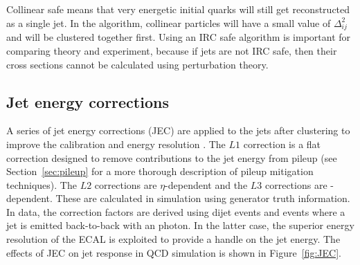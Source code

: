Collinear safe means that very energetic initial quarks will still get reconstructed as a single jet. In the \antikt algorithm, collinear particles will have a small value of $\Delta^2_{ij}$ and will be clustered together first. Using an IRC safe algorithm is important for comparing theory and experiment, because if jets are not IRC safe, then their cross sections cannot be calculated using perturbation theory.

\subsection{Jet energy corrections}
\label{sec:JEC}

A series of jet energy corrections (JEC) are applied to the jets after clustering to improve the calibration and energy resolution \cite{JEC}. The $L1$ correction is a flat correction designed to remove contributions to the jet energy from pileup (see Section~\ref{sec:pileup} for a more thorough description of pileup mitigation techniques). The $L2$ corrections are $\eta$-dependent and the $L3$ corrections are \pt-dependent. These are calculated in simulation using generator truth information. In data, the correction factors are derived using dijet events and events where a jet is emitted back-to-back with an photon. In the latter case, the superior energy resolution of the ECAL is exploited to provide a handle on the jet energy. The effects of JEC on jet response in QCD simulation is shown in Figure~\ref{fig:JEC}.

